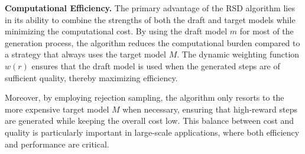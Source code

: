 \documentclass{article}
\theoremstyle{plain}
\theoremstyle{definition}
\theoremstyle{remark}
\begin{document}

\textbf{Computational Efficiency.} The primary advantage of the RSD algorithm lies in its ability to combine the strengths of both the draft and target models while minimizing the computational cost. By using the draft model \( m \) for most of the generation process, the algorithm reduces the computational burden compared to a strategy that always uses the target model \( M \). The dynamic weighting function \( w(r) \) ensures that the draft model is used when the generated steps are of sufficient quality, thereby maximizing efficiency.

Moreover, by employing rejection sampling, the algorithm only resorts to the more expensive target model \( M \) when necessary, ensuring that high-reward steps are generated while keeping the overall cost low. This balance between cost and quality is particularly important in large-scale applications, where both efficiency and performance are critical.
\end{document}
